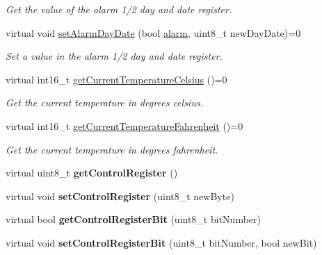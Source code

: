 \begin{DoxyCompactItemize}
\begin{DoxyCompactList}\small\item\em Get the value of the alarm 1/2 day and date register. \end{DoxyCompactList}\item 
virtual void \mbox{\hyperlink{classreal_time_clock_a2c2bb16a7fc59f463fb3aaed2fcd1926}{set\+Alarm\+Day\+Date}} (bool \mbox{\hyperlink{classalarm}{alarm}}, uint8\+\_\+t new\+Day\+Date)=0
\begin{DoxyCompactList}\small\item\em Set a value in the alarm 1/2 day and date register. \end{DoxyCompactList}\item 
virtual int16\+\_\+t \mbox{\hyperlink{classreal_time_clock_ac662348fcf7b5fb51fdcf79f83958a33}{get\+Current\+Temperature\+Celsius}} ()=0
\begin{DoxyCompactList}\small\item\em Get the current temperature in degrees celsius. \end{DoxyCompactList}\item 
virtual int16\+\_\+t \mbox{\hyperlink{classreal_time_clock_a8fe956100fc4e339cd68ab413465f666}{get\+Current\+Temperature\+Fahrenheit}} ()=0
\begin{DoxyCompactList}\small\item\em Get the current temperature in degrees fahrenheit. \end{DoxyCompactList}\item 
\mbox{\label{classreal_time_clock_a13820319507d89a62a5b37b252ea6d0d}} 
virtual uint8\+\_\+t {\bfseries get\+Control\+Register} ()
\item 
\mbox{\label{classreal_time_clock_ab4034ba75fb65a55fb725c37e89f7626}} 
virtual void {\bfseries set\+Control\+Register} (uint8\+\_\+t new\+Byte)
\item 
\mbox{\label{classreal_time_clock_a762441ffb1fbee666cd1642edfb8c929}} 
virtual bool {\bfseries get\+Control\+Register\+Bit} (uint8\+\_\+t bit\+Number)
\item 
\mbox{\label{classreal_time_clock_af9b7db85f78d01060772bdb3b397ea3c}} 
virtual void {\bfseries set\+Control\+Register\+Bit} (uint8\+\_\+t bit\+Number, bool new\+Bit)
\item 

\end{DoxyCompactItemize}
